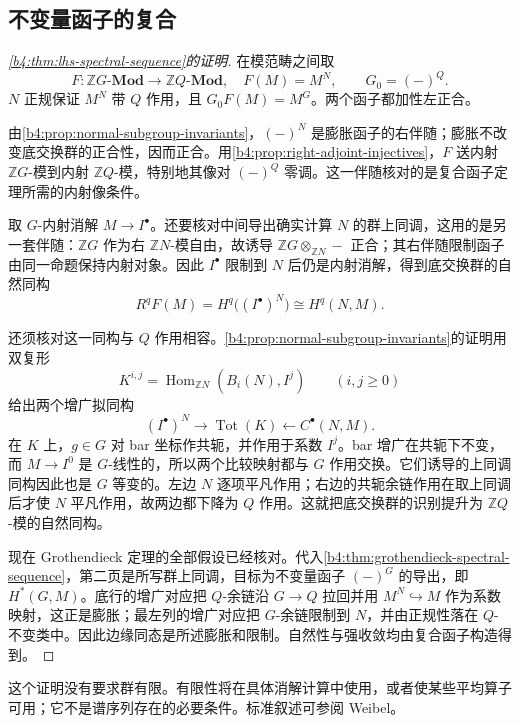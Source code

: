 \subsection{不变量函子的复合}
\label{b4:subsec:1504:02}

\begin{proof}[\cref{b4:thm:lhs-spectral-sequence}的证明]
	在模范畴之间取
	\[
		F:\mathbb ZG\text{-}\mathbf{Mod}\longrightarrow \mathbb ZQ\text{-}\mathbf{Mod},\quad F(M)=M^N, \qquad G_0=(-)^Q.
	\]
	\(N\) 正规保证 \(M^N\) 带 \(Q\) 作用，且 \(G_0F(M)=M^G\)。两个函子都加性左正合。

	由\cref{b4:prop:normal-subgroup-invariants}，\((- )^N\) 是膨胀函子的右伴随；膨胀不改变底交换群的正合性，因而正合。用\cref{b4:prop:right-adjoint-injectives}，\(F\) 送内射 \(\mathbb ZG\)-模到内射 \(\mathbb ZQ\)-模，特别地其像对 \((- )^Q\) 零调。这一伴随核对的是复合函子定理所需的内射像条件。

	取 \(G\)-内射消解 \(M\to I^\bullet\)。还要核对中间导出确实计算 \(N\) 的群上同调，这用的是另一套伴随：\(\mathbb ZG\) 作为右 \(\mathbb ZN\)-模自由，故诱导 \(\mathbb ZG\otimes_{\mathbb ZN}-\) 正合；其右伴随限制函子由同一命题保持内射对象。因此 \(I^\bullet\) 限制到 \(N\) 后仍是内射消解，得到底交换群的自然同构
	\[
		R^qF(M)=H^q\bigl((I^\bullet)^N\bigr)\cong H^q(N,M).
	\]

	还须核对这一同构与 \(Q\) 作用相容。\cref{b4:prop:normal-subgroup-invariants}的证明用双复形
	\[
		K^{i,j}=\operatorname{Hom}_{\mathbb ZN}(B_i(N),I^j)\qquad(i,j\ge0)
	\]
	给出两个增广拟同构
	\[
		(I^\bullet)^N\longrightarrow\operatorname{Tot}(K) \longleftarrow C^\bullet(N,M).
	\]
	在 \(K\) 上，\(g\in G\) 对 bar 坐标作共轭，并作用于系数 \(I^j\)。bar 增广在共轭下不变，而 \(M\to I^0\) 是 \(G\)-线性的，所以两个比较映射都与 \(G\) 作用交换。它们诱导的上同调同构因此也是 \(G\) 等变的。左边 \(N\) 逐项平凡作用；右边的共轭余链作用在取上同调后才使 \(N\) 平凡作用，故两边都下降为 \(Q\) 作用。这就把底交换群的识别提升为 \(\mathbb ZQ\)-模的自然同构。

	现在 Grothendieck 定理的全部假设已经核对。代入\cref{b4:thm:grothendieck-spectral-sequence}，第二页是所写群上同调，目标为不变量函子 \((- )^G\) 的导出，即 \(H^*(G,M)\)。底行的增广对应把 \(Q\)-余链沿 \(G\to Q\) 拉回并用 \(M^N\hookrightarrow M\) 作为系数映射，这正是膨胀；最左列的增广对应把 \(G\)-余链限制到 \(N\)，并由正规性落在 \(Q\)-不变类中。因此边缘同态是所述膨胀和限制。自然性与强收敛均由复合函子构造得到。
\end{proof}

这个证明没有要求群有限。有限性将在具体消解计算中使用，或者使某些平均算子可用；它不是谱序列存在的必要条件。标准叙述可参阅 Weibel\cite[Lemma 6.8.1, Lyndon/Hochschild-Serre Spectral Sequence 6.8.2]{Weibel1994HomologicalAlgebra}。

